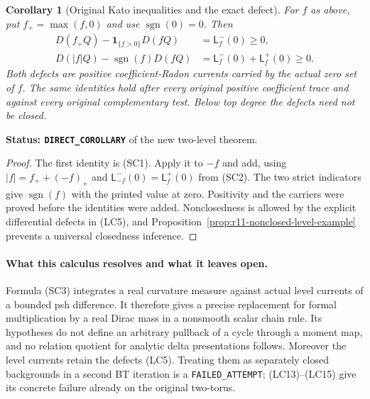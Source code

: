 \documentclass[11pt,a4paper]{article}
\numberwithin{equation}{section}
\newtheorem{corollary}[theorem]{Corollary}
\theoremstyle{definition}
\theoremstyle{remark}
\begin{document}
\begin{corollary}[Original Kato inequalities and the exact defect]
\label{cor:r11-original-kato}
For $f$ as above, put $f_+=\max(f,0)$ and use
$\operatorname{sgn}(0)=0$.  Then
\[
 \begin{split}
 D(f_+Q)-\mathbf1_{\{f>0\}}D(fQ)&=\mathsf L_f^-(0)\geq0,\\
 D(|f|Q)-\operatorname{sgn}(f)D(fQ)
                 &=\mathsf L_f^-(0)+\mathsf L_f^+(0)\geq0.
 \end{split}
 \tag{SC7}
\]
Both defects are positive coefficient-Radon currents carried by
the actual zero set of $f$.  The same identities hold after
every original positive coefficient trace and against every
original complementary test.  Below top degree the defects
need not be closed.
\end{corollary}

\noindent\textbf{Status: \texttt{DIRECT\_COROLLARY}} of the new
two-level theorem.

\begin{proof}
The first identity is (SC1).  Apply it to $-f$ and add, using
$|f|=f_++(-f)_+$ and
$\mathsf L_{-f}^-(0)=\mathsf L_f^+(0)$ from (SC2).
The two strict indicators give $\operatorname{sgn}(f)$ with
the printed value at zero.  Positivity and the carriers were
proved before the identities were added.  Nonclosedness is
allowed by the explicit differential defects in (LC5), and
Proposition~\ref{prop:r11-nonclosed-level-example} prevents a
universal closedness inference.
\end{proof}

\paragraph{What this calculus resolves and what it leaves open.}
Formula (SC3) integrates a real curvature measure against actual
level currents of a bounded psh difference.  It therefore gives
a precise replacement for formal multiplication by a real Dirac
mass in a nonsmooth scalar chain rule.  Its hypotheses do not
define an arbitrary pullback of a cycle through a moment map,
and no relation quotient for analytic delta presentations follows.
Moreover the level currents retain the defects (LC5).  Treating
them as separately closed backgrounds in a second BT iteration
is a \texttt{FAILED\_ATTEMPT}; (LC13)--(LC15) give its concrete
failure already on the original two-torus.


\end{document}
